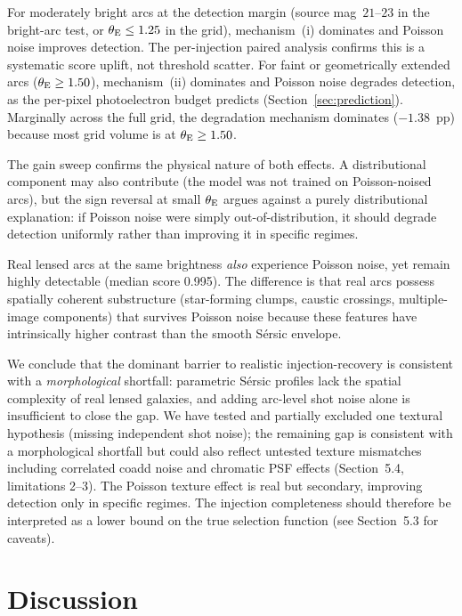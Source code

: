 \documentclass[fleqn,usenatbib]{rasti}
\begin{document}
For moderately bright arcs at the detection margin (source mag~$21$--$23$ in the bright-arc test, or $\theta_{\rm E} \leq 1.25$ in the grid), mechanism~(i) dominates and Poisson noise improves detection.  The per-injection paired analysis confirms this is a systematic score uplift, not threshold scatter.  For faint or geometrically extended arcs ($\theta_{\rm E} \geq 1.50$), mechanism~(ii) dominates and Poisson noise degrades detection, as the per-pixel photoelectron budget predicts (Section~\ref{sec:prediction}).  Marginally across the full grid, the degradation mechanism dominates ($-1.38$~pp) because most grid volume is at $\theta_{\rm E} \geq 1.50$.

The gain sweep confirms the physical nature of both effects.  A distributional component may also contribute (the model was not trained on Poisson-noised arcs), but the sign reversal at small $\theta_{\rm E}$ argues against a purely distributional explanation: if Poisson noise were simply out-of-distribution, it should degrade detection uniformly rather than improving it in specific regimes.

Real lensed arcs at the same brightness \emph{also} experience Poisson noise, yet remain highly detectable (median score 0.995).  The difference is that real arcs possess spatially coherent substructure (star-forming clumps, caustic crossings, multiple-image components) that survives Poisson noise because these features have intrinsically higher contrast than the smooth S\'{e}rsic envelope.

We conclude that the dominant barrier to realistic injection-recovery is consistent with a \emph{morphological} shortfall: parametric S\'{e}rsic profiles lack the spatial complexity of real lensed galaxies, and adding arc-level shot noise alone is insufficient to close the gap.  We have tested and partially excluded one textural hypothesis (missing independent shot noise); the remaining gap is consistent with a morphological shortfall but could also reflect untested texture mismatches including correlated coadd noise and chromatic PSF effects (Section~5.4, limitations 2--3).  The Poisson texture effect is real but secondary, improving detection only in specific regimes.  The injection completeness should therefore be interpreted as a lower bound on the true selection function (see Section~5.3 for caveats).


\section{Discussion}
\end{document}
